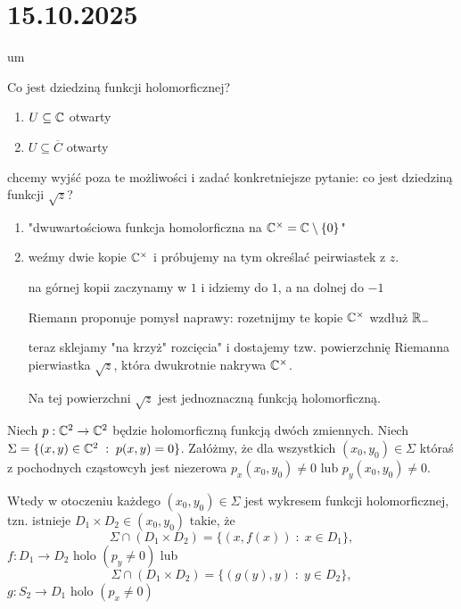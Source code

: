 \section{15.10.2025}{um}

Co jest dziedziną funkcji holomorficznej?
\begin{enumerate}
  \item $U\subseteq \mathbb{C}$ otwarty
  \item $U\subseteq \overline{C}$ otwarty
\end{enumerate}
chcemy wyjść poza te możliwości i zadać konkretniejsze pytanie: co jest dziedziną funkcji $\sqrt{z}$?
\begin{enumerate}
  \item "dwuwartościowa funkcja homolorficzna na $\mathbb{C}^\times=\mathbb{C}\setminus\{0\}$"
  \item weźmy dwie kopie $\mathbb{C}^\times$ i próbujemy na tym określać peirwiastek z $z$.

    na górnej kopii zaczynamy w $1$ i idziemy do $1$, a na dolnej do $-1$

    \begin{center}
    \end{center}
    Riemann proponuje pomysł naprawy: rozetnijmy te kopie $\mathbb{C}^\times$ wzdłuż $\mathbb{R}_-$
    \begin{center}
    \end{center}
    teraz sklejamy "na krzyż" rozcięcia" i dostajemy tzw. powierzchnię Riemanna pierwiastka $\sqrt{z}$, która dwukrotnie nakrywa $\mathbb{C}^\times$.

    Na tej powierzchni $\sqrt{z}$ jest jednoznaczną funkcją holomorficzną.
\end{enumerate}

\begin{fact}{}{}
  Niech $p:\mathbb{C}^2\to\mathbb{C}^2$ będzie holomorficzną funkcją dwóch zmiennych. Niech $\Sigma=\{(x,y)\in\mathbb{C}^2\;:\;p(x,y)=0\}$. Załóżmy, że dla wszystkich $(x_0, y_0)\in\Sigma$ któraś z pochodnych cząstowcyh jest niezerowa $p_x(x_0, y_0)\neq 0$ lub $p_y(x_0, y_0)\neq 0$.

  Wtedy w otoczeniu każdego $(x_0, y_0)\in\Sigma$ jest wykresem funkcji holomorficznej, tzn. istnieje $D_1\times D_2\in (x_0, y_0)$ takie, że 
  $$\Sigma\cap (D_1\times D_2)=\{(x, f(x))\;:\;x\in D_1\},$$
  $f:D_1\to D_2$ holo $(p_y\neq 0)$ lub 
  $$\Sigma\cap (D_1\times D_2)=\{(g(y), y)\;:\;y\in D_2\},$$
  $g:S_2\to D_1$ holo $(p_x\neq 0)$
\end{fact}

